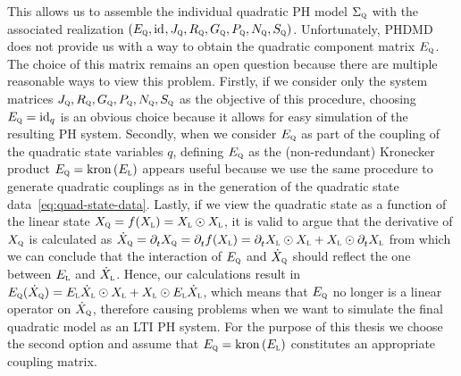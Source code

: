 This allows us to assemble the individual quadratic \ac{PH} model $\Sigma_\msc{q}$ with the associated realization $(E_\msc{q}, \id, J_\msc{q}, R_\msc{q}, G_\msc{q}, P_\msc{q}, N_\msc{q}, S_\msc{q})$.
Unfortunately, \ac{PHDMD} does not provide us with a way to obtain the quadratic component matrix $E_\msc{q}$.
The choice of this matrix remains an open question because there are multiple reasonable ways to view this problem.
Firstly, if we consider only the system matrices $J_\msc{q}, R_\msc{q}, G_\msc{q}, P_\msc{q}, N_\msc{q}, S_\msc{q}$ as the objective of this procedure, choosing $E_\msc{q} = \id[q]$ is an obvious choice because it allows for easy simulation of the resulting \ac{PH} system.
Secondly, when we consider $E_\msc{q}$ as part of the coupling of the quadratic state variables $q$, defining $E_\msc{q}$ as the (non-redundant) Kronecker product $E_\msc{q} = \kron{E_\msc{l}}$ appears useful because we use the same procedure to generate quadratic couplings as in the generation of the quadratic state data~\eqref{eq:quad-state-data}.
Lastly, if we view the quadratic state as a function of the linear state $X_\msc{q} = f(X_\msc{l}) = X_\msc{l} \odot X_\msc{l}$, it is valid to argue that the derivative of $X_\msc{q}$ is calculated as $\dot{X}_\msc{q} = \pd[t]{} X_\msc{q}= \pd[t]{} f(X_\msc{l}) = \pd[t]{} X_\msc{l} \odot X_\msc{l} + X_\msc{l} \odot \pd[t]{} X_\msc{l}$ from which we can conclude that the interaction of $E_\msc{q}$ and $\dot{X}_\msc{q}$ should reflect the one between $E_\msc{l}$ and $\dot{X}_\msc{l}$.
Hence, our calculations result in $E_\msc{q} (\dot{X}_\msc{q}) = E_\msc{l} \dot{X}_\msc{l} \odot X_\msc{l} + X_\msc{l} \odot E_\msc{l} \dot{X}_\msc{l}$, which means that $E_\msc{q}$ no longer is a linear operator on $\dot{X}_\msc{q}$, therefore causing problems when we want to simulate the final quadratic model as an \ac{LTI} \ac{PH} system.
For the purpose of this thesis we choose the second option and assume that $E_\msc{q} = \kron{E_\msc{l}}$ constitutes an appropriate coupling matrix.

